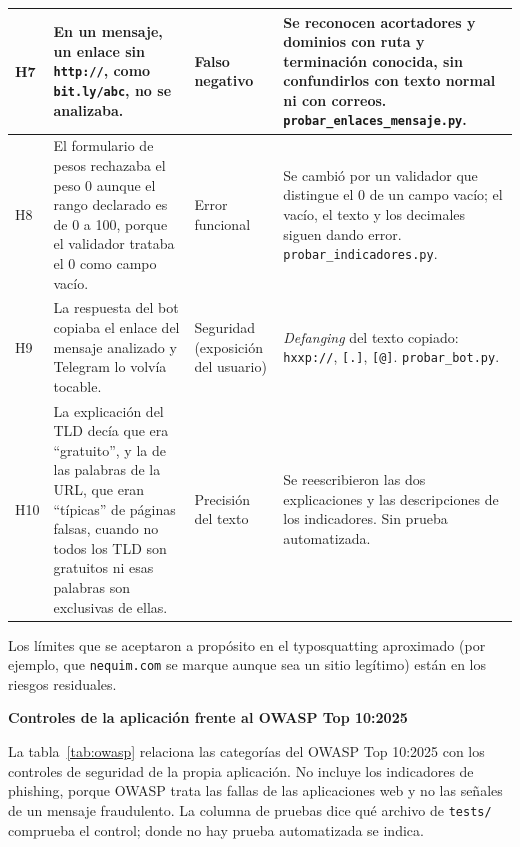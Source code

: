 \documentclass[journal,onecolumn,12pt,draftclsnofoot]{IEEEtran}
\newcommand{\apartado}[1]{\par\medskip\noindent\textbf{#1}\par\smallskip}
\begin{document}
\begin{longtable}{|>{\raggedright\arraybackslash}p{}|>{\raggedright\arraybackslash}p{}|>{\raggedright\arraybackslash}p{}|>{\raggedright\arraybackslash}p{}|}
H7 & En un mensaje, un enlace sin \texttt{http://}, como \texttt{bit.ly/abc}, no se analizaba. & Falso negativo & Se reconocen acortadores y dominios con ruta y terminación conocida, sin confundirlos con texto normal ni con correos. \texttt{probar\_enlaces\_mensaje.py}. \\ \hline
H8 & El formulario de pesos rechazaba el peso 0 aunque el rango declarado es de 0 a 100, porque el validador trataba el 0 como campo vacío. & Error funcional & Se cambió por un validador que distingue el 0 de un campo vacío; el vacío, el texto y los decimales siguen dando error. \texttt{probar\_indicadores.py}. \\ \hline
H9 & La respuesta del bot copiaba el enlace del mensaje analizado y Telegram lo volvía tocable. & Seguridad (exposición del usuario) & \emph{Defanging} del texto copiado: \texttt{hxxp://}, \texttt{[.]}, \texttt{[@]}. \texttt{probar\_bot.py}. \\ \hline
H10 & La explicación del TLD decía que era ``gratuito'', y la de las palabras de la URL, que eran ``típicas'' de páginas falsas, cuando no todos los TLD son gratuitos ni esas palabras son exclusivas de ellas. & Precisión del texto & Se reescribieron las dos explicaciones y las descripciones de los indicadores. Sin prueba automatizada. \\ \hline
\end{longtable}
\endgroup

Los límites que se aceptaron a propósito en el typosquatting aproximado (por ejemplo, que \texttt{nequim.com} se marque aunque sea un sitio legítimo) están en los riesgos residuales.

\apartado{Controles de la aplicación frente al OWASP Top 10:2025}

La tabla~\ref{tab:owasp} relaciona las categorías del OWASP Top 10:2025 con los controles de seguridad de la propia aplicación. No incluye los indicadores de phishing, porque OWASP trata las fallas de las aplicaciones web y no las señales de un mensaje fraudulento. La columna de pruebas dice qué archivo de \texttt{tests/} comprueba el control; donde no hay prueba automatizada se indica.
\end{document}
